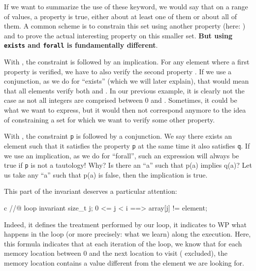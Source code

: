 If we want to summarize the use of these keyword, we would say that on a
range of values, a property is true, either about at least one of them
or about all of them. A common scheme is to constrain this set using
another property (here: ) and to prove the
actual interesting property on this smaller set. \textbf{But using
\texttt{exists} and \texttt{forall} is fundamentally different}.



With ,
the constraint  is followed by an implication.
For any element where a first property  is verified, we have
to also verify the second property . If we use a conjunction,
as we do for ``exists'' (which we will later explain), that would mean that
all elements verify both  and . In our previous
example, it is clearly not the case as not all integers are comprised between
0 and . Sometimes, it could be what we want to express, but
it would then not correspond anymore to the idea of constraining a set for which
we want to verify some other property.



With , the
constraint \texttt{p} is followed by a conjunction. We say there exists
an element such that it satisfies the property \texttt{p} at the same
time it also satisfies \texttt{q}. If we use an implication, as we do
for ``forall'', such an expression will always be true if \texttt{p} is
not a tautology! Why? Is there an ``a'' such that p(a) implies q(a)? Let
us take any ``a'' such that p(a) is false, then the implication is true.



This part of the invariant deserves a particular attention:



\begin{CodeBlock}{c}
//@ loop invariant \forall size_t j; 0 <= j < i ==> array[j] != element;
\end{CodeBlock}



Indeed, it defines the treatment performed by our loop, it indicates to
WP what happens in the loop (or more precisely: what we learn) along
the execution. Here, this formula indicates that at each iteration of
the loop, we know that for each memory location between 0 and the next
location to visit ( excluded), the memory location contains a
value different from the element we are looking for.


